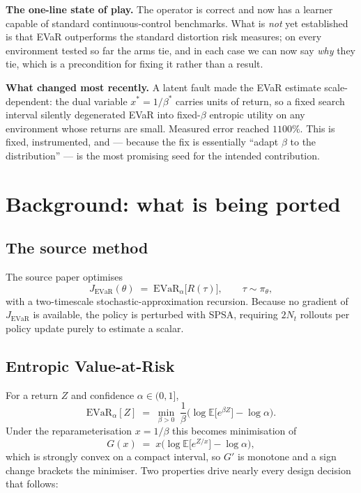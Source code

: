 \documentclass[11pt,a4paper]{article}
\newcommand{\evar}{\mathrm{EVaR}}
\begin{document}
\vspace{0.5em}
\noindent\textbf{The one-line state of play.} The operator is correct and now has a
learner capable of standard continuous-control benchmarks. What is \emph{not} yet
established is that EVaR outperforms the standard distortion risk measures; on
every environment tested so far the arms tie, and in each case we can now say
\emph{why} they tie, which is a precondition for fixing it rather than a result.

\vspace{0.5em}
\noindent\textbf{What changed most recently.} A latent fault made the EVaR estimate
scale-dependent: the dual variable $x^\ast = 1/\beta^\ast$ carries units of return,
so a fixed search interval silently degenerated EVaR into fixed-$\beta$ entropic
utility on any environment whose returns are small. Measured error reached
$1100\%$. This is fixed, instrumented, and --- because the fix is essentially
``adapt $\beta$ to the distribution'' --- is the most promising seed for the
intended contribution.

\section{Background: what is being ported}

\subsection{The source method}

The source paper optimises
\begin{equation}
J_{\evar}(\theta) \;=\; \evar_\alpha\big[R(\tau)\big], \qquad \tau \sim \pi_\theta,
\end{equation}
with a two-timescale stochastic-approximation recursion. Because no gradient of
$J_{\evar}$ is available, the policy is perturbed with SPSA, requiring $2N_t$
rollouts per policy update purely to estimate a scalar.

\subsection{Entropic Value-at-Risk}

For a return $Z$ and confidence $\alpha \in (0,1]$,
\begin{equation}
\evar_\alpha[Z] \;=\; \min_{\beta > 0}\; \frac{1}{\beta}
\Big(\log \mathbb{E}\big[e^{\beta Z}\big] - \log \alpha\Big).
\label{eq:evar}
\end{equation}
Under the reparameterisation $x = 1/\beta$ this becomes minimisation of
\begin{equation}
G(x) \;=\; x\Big(\log \mathbb{E}\big[e^{Z/x}\big] - \log\alpha\Big),
\label{eq:G}
\end{equation}
which is strongly convex on a compact interval, so $G'$ is monotone and a sign
change brackets the minimiser. Two properties drive nearly every design decision
that follows:
\end{document}
